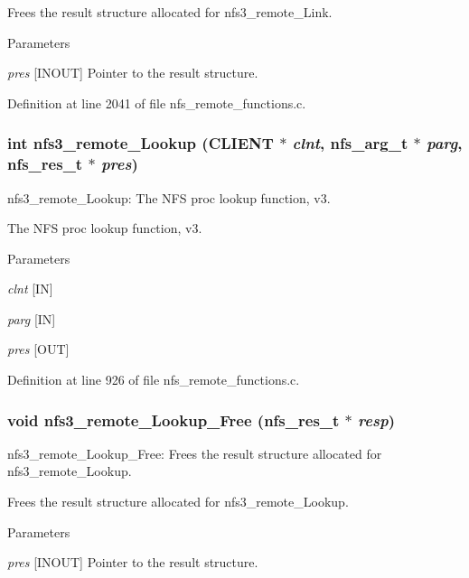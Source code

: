 Frees the result structure allocated for nfs3\_\-remote\_\-Link.


\begin{DoxyParams}{Parameters}
\item[{\em pres}][INOUT] Pointer to the result structure. \end{DoxyParams}


Definition at line 2041 of file nfs\_\-remote\_\-functions.c.
\subsubsection[{nfs3\_\-remote\_\-Lookup}]{\setlength{\rightskip}{0pt plus 5cm}int nfs3\_\-remote\_\-Lookup (CLIENT $\ast$ {\em clnt}, \/  nfs\_\-arg\_\-t $\ast$ {\em parg}, \/  nfs\_\-res\_\-t $\ast$ {\em pres})}\label{group__NFSprocs_gaf3f3347a08ce55f01227c401d0e49053}
nfs3\_\-remote\_\-Lookup: The NFS proc lookup function, v3.

The NFS proc lookup function, v3.


\begin{DoxyParams}{Parameters}
\item[{\em clnt}][IN] \item[{\em parg}][IN] \item[{\em pres}][OUT] \end{DoxyParams}


Definition at line 926 of file nfs\_\-remote\_\-functions.c.
\subsubsection[{nfs3\_\-remote\_\-Lookup\_\-Free}]{\setlength{\rightskip}{0pt plus 5cm}void nfs3\_\-remote\_\-Lookup\_\-Free (nfs\_\-res\_\-t $\ast$ {\em resp})}\label{group__NFSprocs_ga6dedbfc85992188e098b8a3da8afcde9}
nfs3\_\-remote\_\-Lookup\_\-Free: Frees the result structure allocated for nfs3\_\-remote\_\-Lookup.

Frees the result structure allocated for nfs3\_\-remote\_\-Lookup.


\begin{DoxyParams}{Parameters}
\item[{\em pres}][INOUT] Pointer to the result structure. \end{DoxyParams}


